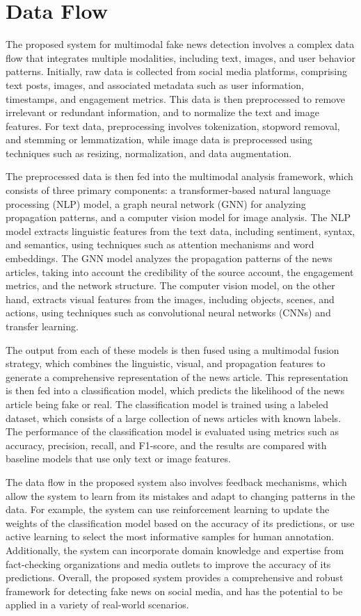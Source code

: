 \documentclass[conference]{IEEEtran}
\begin{document}
\section{Data Flow}
The proposed system for multimodal fake news detection involves a complex data flow that integrates multiple modalities, including text, images, and user behavior patterns. Initially, raw data is collected from social media platforms, comprising text posts, images, and associated metadata such as user information, timestamps, and engagement metrics. This data is then preprocessed to remove irrelevant or redundant information, and to normalize the text and image features. For text data, preprocessing involves tokenization, stopword removal, and stemming or lemmatization, while image data is preprocessed using techniques such as resizing, normalization, and data augmentation.

The preprocessed data is then fed into the multimodal analysis framework, which consists of three primary components: a transformer-based natural language processing (NLP) model, a graph neural network (GNN) for analyzing propagation patterns, and a computer vision model for image analysis. The NLP model extracts linguistic features from the text data, including sentiment, syntax, and semantics, using techniques such as attention mechanisms and word embeddings. The GNN model analyzes the propagation patterns of the news articles, taking into account the credibility of the source account, the engagement metrics, and the network structure. The computer vision model, on the other hand, extracts visual features from the images, including objects, scenes, and actions, using techniques such as convolutional neural networks (CNNs) and transfer learning.

The output from each of these models is then fused using a multimodal fusion strategy, which combines the linguistic, visual, and propagation features to generate a comprehensive representation of the news article. This representation is then fed into a classification model, which predicts the likelihood of the news article being fake or real. The classification model is trained using a labeled dataset, which consists of a large collection of news articles with known labels. The performance of the classification model is evaluated using metrics such as accuracy, precision, recall, and F1-score, and the results are compared with baseline models that use only text or image features.

The data flow in the proposed system also involves feedback mechanisms, which allow the system to learn from its mistakes and adapt to changing patterns in the data. For example, the system can use reinforcement learning to update the weights of the classification model based on the accuracy of its predictions, or use active learning to select the most informative samples for human annotation. Additionally, the system can incorporate domain knowledge and expertise from fact-checking organizations and media outlets to improve the accuracy of its predictions. Overall, the proposed system provides a comprehensive and robust framework for detecting fake news on social media, and has the potential to be applied in a variety of real-world scenarios.
\end{document}
